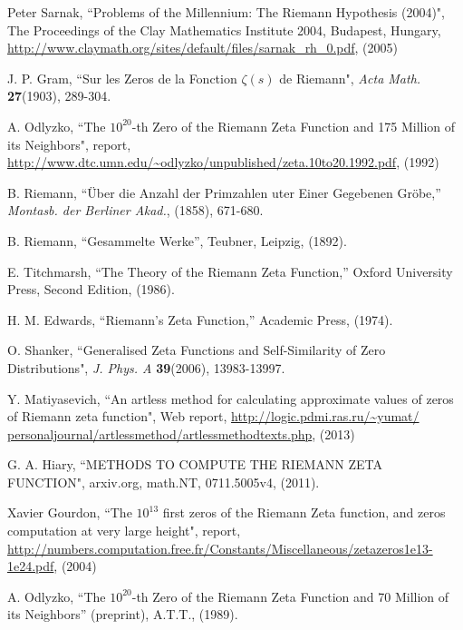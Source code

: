 \documentclass[twoside]{article}
\begin{document}
\begin{thebibliography} {}

 Peter Sarnak,
``Problems of the Millennium: The Riemann Hypothesis (2004)", The Proceedings of the Clay Mathematics Institute 2004, Budapest, Hungary,
\url{http://www.claymath.org/sites/default/files/sarnak_rh_0.pdf}, (2005)

 J. P. Gram, 
``Sur les Zeros de la Fonction  $\zeta ( s )$  de Riemann",
{\it Acta Math.} {\bf27}(1903), 289-304.

  A. Odlyzko,
``The $10^{20}$-th Zero of the Riemann Zeta
Function and 175 Million of its Neighbors", report,
\url{http://www.dtc.umn.edu/~odlyzko/unpublished/zeta.10to20.1992.pdf}, (1992)


 B. Riemann, ``\"{U}ber die Anzahl der Primzahlen uter
Einer Gegebenen Gr\"{o}be,'' {\it Montasb. der Berliner Akad.}, (1858),
671-680.

 B. Riemann, ``Gesammelte Werke'', Teubner, Leipzig, (1892).

 E. Titchmarsh, ``The Theory of the Riemann Zeta
Function,'' Oxford University Press, Second Edition, (1986).

 H. M. Edwards, ``Riemann's Zeta Function,'' 
Academic Press,  (1974).

 O. Shanker, 
``Generalised Zeta Functions and Self-Similarity of Zero Distributions",
{\it J.  Phys. A} {\bf39}(2006), 13983-13997.

 Y. Matiyasevich, 
``An artless method for calculating approximate values of
zeros of Riemann zeta function",
Web report, \url{http://logic.pdmi.ras.ru/~yumat/
personaljournal/artlessmethod/artlessmethodtexts.php}, (2013)

 G. A. Hiary,
``METHODS TO COMPUTE THE RIEMANN ZETA
FUNCTION", arxiv.org, math.NT, 0711.5005v4, (2011).

 Xavier Gourdon,
``The $10^{13}$ first zeros of the Riemann Zeta function,
and zeros computation at very large height", report,
\url{http://numbers.computation.free.fr/Constants/Miscellaneous/zetazeros1e13-1e24.pdf}, (2004)

 A. Odlyzko, ``The $10^{20}$-th Zero of the Riemann Zeta
Function and 70 Million of its Neighbors'' (preprint), A.T.T., (1989).


\end{thebibliography} 
\end{document}
